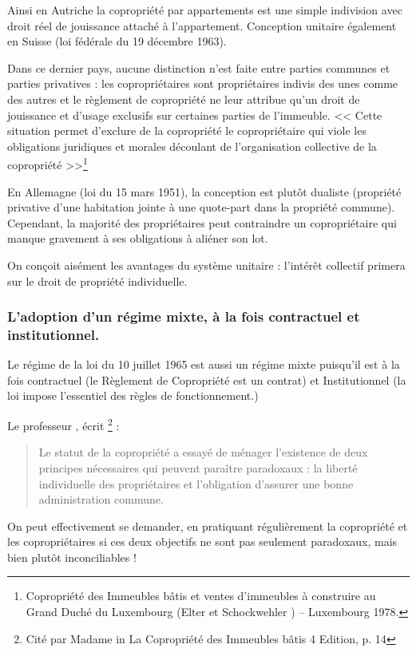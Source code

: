 				Ainsi en Autriche la copropriété par appartements est une simple indivision avec droit réel de jouissance attaché à l'appartement. Conception unitaire également en Suisse (loi fédérale du 19 décembre 1963).
				
				Dans ce dernier pays, aucune distinction n’est faite entre parties communes et parties privatives : les copropriétaires sont propriétaires indivis des unes comme des autres et le règlement de copropriété ne leur attribue qu’un droit de jouissance et d’usage exclusifs sur certaines parties de l’immeuble. << Cette situation permet d’exclure de la copropriété le copropriétaire qui viole les obligations juridiques et morales découlant de l’organisation collective de la copropriété >>\footnote{Copropriété des Immeubles bâtis et ventes d’immeubles à construire au Grand Duché du Luxembourg (Elter et Schockwehler ) – Luxembourg 1978.}
				
				En Allemagne (loi du 15 mars 1951), la conception est plutôt dualiste (propriété privative d’une habitation jointe à une quote-part dans la propriété commune). Cependant, la majorité des propriétaires peut contraindre un copropriétaire qui manque gravement à ses obligations à aliéner son lot.
				
				On conçoit aisément les avantages du système unitaire : l’intérêt collectif primera sur le droit de propriété individuelle.
		
		\subsubsection{L’adoption d’un régime mixte, à la fois contractuel et institutionnel.}
			Le régime de la loi du 10 juillet 1965 est aussi un régime mixte puisqu’il est à la fois contractuel (le Règlement de Copropriété est un contrat) et Institutionnel (la loi impose l'essentiel des règles de fonctionnement.)
			
			Le professeur , écrit \footnote{Cité par Madame  in La Copropriété des Immeubles bâtis 4\ieme{} Edition, p. 14 } :
			\begin{quote}
				Le statut de la copropriété a essayé de ménager l'existence de deux principes nécessaires qui peuvent paraître paradoxaux : la liberté individuelle des propriétaires et l'obligation d'assurer une bonne administration commune.
			\end{quote}
			
			On peut effectivement se demander, en pratiquant régulièrement la copropriété et les copropriétaires si ces deux objectifs ne sont pas seulement paradoxaux, mais bien plutôt inconciliables !
		
